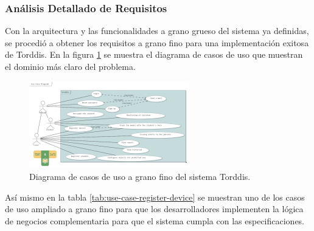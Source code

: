 \documentclass[a4paper,fleqn]{cas-sc}
\begin{document}
			\subsubsection{Análisis Detallado de Requisitos}
				Con la arquitectura y las funcionalidades a grano grueso del sistema ya definidas, se procedió a obtener los requisitos a grano fino para una implementación exitosa de Torddis. En la figura \ref{fig:Fine-GrainedUseCas} se muestra el diagrama de casos de uso que muestran el dominio más claro del problema.
				
				\begin{figure}[hbt!]
					\centering
					\includegraphics[frame,scale=0.5, width=\linewidth]{figs/Figure_7}
					\caption{Diagrama de casos de uso a grano fino del sistema Torddis. \label{fig:Fine-GrainedUseCas}}
				\end{figure} 
				
				Así mismo en la tabla \ref{tab:use-case-register-device} se muestran uno de los casos de uso ampliado a grano fino para que los desarrolladores implementen la lógica de negocios complementaria para que el sistema cumpla con las especificaciones.
				
\end{document}

